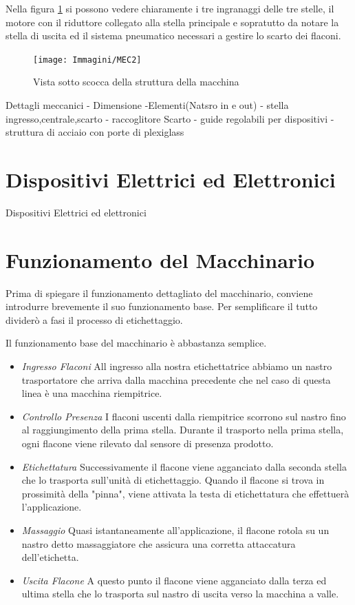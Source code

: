\documentclass[12pt, a4paper, oneside]{book}
\begin{document}
Nella figura \ref{mec2} si possono vedere chiaramente i tre ingranaggi delle tre stelle, il motore con il riduttore collegato alla stella principale e sopratutto da notare la stella di uscita ed il sistema pneumatico necessari a gestire lo scarto dei flaconi.

\begin{figure}[H]
	\centering
	\texttt{[image: Immagini/MEC2]}
	\label{mec2}
	\caption{ Vista sotto scocca della struttura della macchina}
\end{figure}






Dettagli meccanici - Dimensione -Elementi(Natsro in e out) - stella ingresso,centrale,scarto - raccoglitore Scarto - guide regolabili per dispositivi - struttura di acciaio con porte di plexiglass
\section{Dispositivi Elettrici ed Elettronici}
Dispositivi Elettrici ed elettronici
\section{Funzionamento del Macchinario}
Prima di spiegare il funzionamento dettagliato del macchinario, conviene introdurre brevemente il suo funzionamento base. Per semplificare il tutto dividerò a fasi il processo di etichettaggio.

Il funzionamento base del macchinario è abbastanza semplice. 
\begin{itemize}
	\item \textit{Ingresso Flaconi} All ingresso alla nostra etichettatrice abbiamo un nastro trasportatore che arriva dalla macchina precedente che nel caso di questa linea è una macchina riempitrice.
	\item \textit{Controllo Presenza}  I flaconi uscenti dalla riempitrice scorrono sul nastro fino al raggiungimento della prima stella. Durante il trasporto nella prima stella, ogni flacone viene rilevato dal sensore di presenza prodotto.
	\item \textit{Etichettatura} Successivamente il flacone viene agganciato dalla seconda stella che lo trasporta sull'unità di etichettaggio. Quando il flacone si trova in prossimità della "pinna", viene attivata la testa di etichettatura che effettuerà l'applicazione.
	\item \textit{Massaggio} Quasi istantaneamente all'applicazione, il flacone rotola su un nastro detto massaggiatore che assicura una corretta attaccatura dell'etichetta.
	\item \textit{Uscita Flacone} A questo punto il flacone viene agganciato dalla terza ed ultima stella che lo trasporta sul nastro di uscita verso la macchina a valle. 
\end{itemize}
\end{document}
